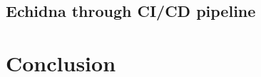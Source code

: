 \documentclass{article}
\begin{document}
\subsection{Echidna through CI/CD pipeline}

\section{Conclusion}
    \lipsum[6]  %

\printbibliography
\end{document}
